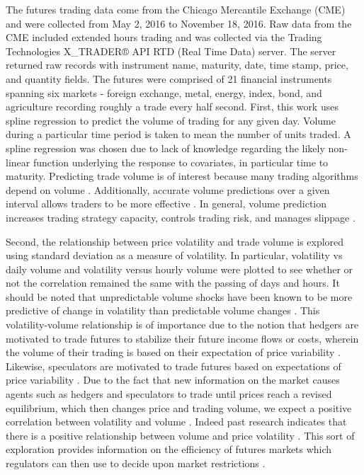 \documentclass[12pt]{article}
\begin{document}
The futures trading data come from the Chicago Mercantile Exchange (CME) and were collected from May 2, 2016 to November 18, 2016. %
Raw data from the CME included extended hours trading and was collected via the Trading Technologies X\_TRADER® API RTD (Real Time Data) server. The server returned raw records with instrument name, maturity, date, time stamp, price, and quantity fields.
The futures were comprised of 21 financial instruments spanning six markets - foreign exchange, metal, energy, index, bond, and agriculture recording roughly a trade every half second. %
First, this work uses spline regression to predict the volume of trading for any given day. Volume during a particular time period is taken to mean the number of units traded. A spline regression was chosen due to lack of knowledge regarding the likely non-linear function underlying the response to covariates, in particular time to maturity. Predicting trade volume is of interest because many trading algorithms depend on volume \cite{satish2014predicting}.   Additionally, accurate volume predictions over a given interval allows traders to be more effective \cite{satish2014predicting}. In general, volume prediction increases trading strategy capacity, controls trading risk, and manages slippage \cite{satish2014predicting}.  

Second, the relationship between price volatility and trade volume is explored using standard deviation as a measure of volatility. In particular, volatility vs daily volume and volatility versus hourly volume were plotted to see whether or not the correlation remained the same with the passing of days and hours. It should be noted that unpredictable volume shocks have been known to be more predictive of change in volatility than predictable volume changes \cite{bessembinder1993price}.
This volatility-volume relationship is of importance due to the notion that hedgers are motivated to trade futures to stabilize their future income flows or costs, wherein the volume of their trading is based on their expectation of price variability \cite{foster1995volume}. Likewise, speculators are motivated to trade futures based on expectations of price variability \cite{foster1995volume}. Due to the fact that new information on the market causes agents such as hedgers and speculators to trade until prices reach a revised equilibrium, which then changes price and trading volume, we expect a positive correlation between volatility and volume \cite{foster1995volume}. Indeed past research indicates that there is a positive relationship between volume and price volatility \cite{foster1995volume}. This sort of exploration provides information on the efficiency of futures markets which regulators can then use to decide upon market restrictions \cite{foster1995volume}. 
\end{document}
